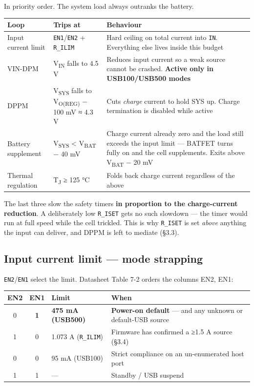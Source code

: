\documentclass[11pt]{article}
\begin{document}
In priority order. The system load always outranks the battery.

\begin{tabularx}{\linewidth}{@{}l l X@{}}
\toprule
\textbf{Loop} & \textbf{Trips at} & \textbf{Behaviour} \\
\midrule
Input current limit & \texttt{EN1}/\texttt{EN2} + \texttt{R_ILIM} & Hard ceiling on total current into \texttt{IN}. Everything else lives inside this budget \\
VIN-DPM & V\textsubscript{IN} falls to 4.5 V & Reduces input current so a weak source cannot be crashed. \textbf{Active only in USB100/USB500 modes} \\
DPPM & V\textsubscript{SYS} falls to V\textsubscript{O(REG)} − 100 mV ≈ 4.3 V & Cuts \textit{charge} current to hold SYS up. Charge termination is disabled while active \\
Battery supplement & V\textsubscript{SYS} < V\textsubscript{BAT} − 40 mV & Charge current already zero and the load still exceeds the input limit — BATFET turns fully on and the cell supplements. Exits above V\textsubscript{BAT} − 20 mV \\
Thermal regulation & T\textsubscript{J} ≥ 125 °C & Folds back charge current regardless of the above \\
\bottomrule
\end{tabularx}

The last three slow the safety timers \textbf{in proportion to the charge-current reduction}. A
deliberately low \texttt{R_ISET} gets no such slowdown — the timer would run at full speed while the
cell trickled. This is why \texttt{R_ISET} is set \textit{above} anything the input can deliver, and
DPPM is left to mediate (§3.3).

\subsection{Input current limit — mode strapping}

\texttt{EN2}/\texttt{EN1} select the limit. Datasheet Table 7-2 orders the columns EN2, EN1:

\begin{tabularx}{\linewidth}{@{}c c l X@{}}
\toprule
\textbf{EN2} & \textbf{EN1} & \textbf{Limit} & \textbf{When} \\
\midrule
0 & \textbf{1} & \textbf{475 mA (USB500)} & \textbf{Power-on default} — and any unknown or default-USB source \\
1 & 0 & 1.073 A (\texttt{R_ILIM}) & Firmware has confirmed a ≥1.5 A source (§3.4) \\
0 & 0 & 95 mA (USB100) & Strict compliance on an un-enumerated host port \\
1 & 1 & — & Standby / USB suspend \\
\bottomrule
\end{tabularx}
\end{document}
